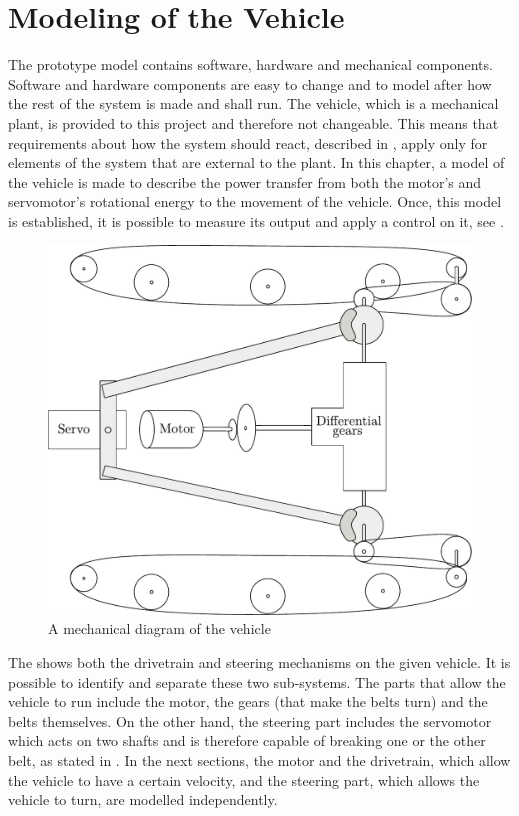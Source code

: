 \chapter{Modeling of the Vehicle}\label{cha:ModelOfVehicle}

The prototype model contains software, hardware and mechanical components. Software and hardware components are easy to change and to model after how the rest of the system is made and shall run. The vehicle, which is a mechanical plant, is provided to this project and therefore not changeable. This means that requirements about how the system should react, described in , apply only for elements of the system that are external to the plant. In this chapter, a model of the vehicle is made to describe the power transfer from both the motor's and servomotor's rotational energy to the movement of the vehicle. Once, this model is established, it is possible to measure its output and apply a control on it, see .


\begin{figure}[H]
	\centering
	\includegraphics[width=\textwidth]{figures/completeMechanical.pdf}
	\caption{A mechanical diagram of the vehicle}
	\label{fig:completeMechanicalDiagram}
\end{figure}

The  shows both the drivetrain and steering mechanisms on the given vehicle. It is possible to identify and separate these two sub-systems. The parts that allow the vehicle to run include the motor, the gears (that make the belts turn) and the belts themselves. On the other hand, the steering part includes the servomotor which acts on two shafts and is therefore capable of breaking one or the other belt, as stated in . In the next sections, the motor and the drivetrain, which allow the vehicle to have a certain velocity, and the steering part, which allows the vehicle to turn, are modelled independently.